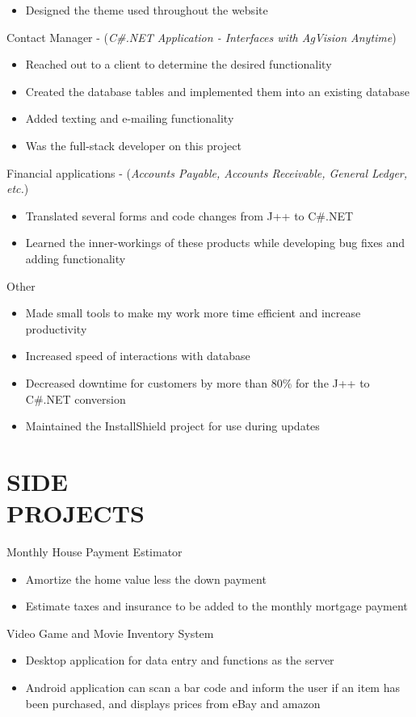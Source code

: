 \documentclass[line,margin]{res}
\begin{document}
\begin{resume}
\begin{itemize}
		\item Designed the theme used throughout the website 
	\end{itemize}
	Contact Manager - ({\sl C\#.NET Application - Interfaces with AgVision Anytime})
	\begin{itemize}
		\item Reached out to a client to determine the desired functionality
		\item Created the database tables and implemented them into an existing database
		\item Added texting and e-mailing functionality
		\item Was the full-stack developer on this project
	\end{itemize}
	Financial applications - ({\sl Accounts Payable, Accounts Receivable, General Ledger, etc.})
	\begin{itemize}
		\item Translated several forms and code changes from J++ to C\#.NET
		\item Learned the inner-workings of these products while developing bug fixes and adding functionality
	\end{itemize}
	Other
	\begin{itemize}
    	\item Made small tools to make my work more time efficient and increase productivity
    	\item Increased speed of interactions with database
    	\item Decreased downtime for customers by more than 80\% for the J++ to C\#.NET conversion
    	\item Maintained the InstallShield project for use during updates
    \end{itemize}
               
\section{SIDE \\ PROJECTS}
	Monthly House Payment Estimator
	\begin{itemize}
		\item Amortize the home value less the down payment
		\item Estimate taxes and insurance to be added to the monthly mortgage payment
	\end{itemize}
	Video Game and Movie Inventory System
	\begin{itemize}
		\item Desktop application for data entry and functions as the server
		\item Android application can scan a bar code and inform the user if an item has been purchased, and displays prices from eBay and amazon
	\end{itemize}
           

\end{resume}
\end{document}
